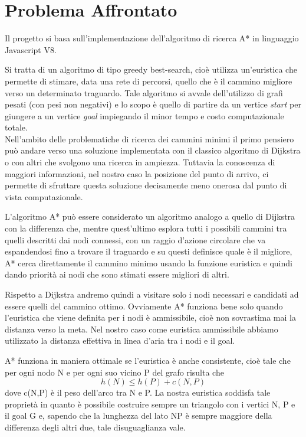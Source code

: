 \documentclass[12pt,a4paper]{report}
\begin{document}
\tableofcontents
\chapter{Problema Affrontato}
Il progetto si basa sull'implementazione dell'algoritmo di ricerca A* in linguaggio Javascript V8.

Si tratta di un algoritmo di tipo greedy best-search, cioè utilizza un'euristica che permette di stimare, data una rete di percorsi, quello che è il cammino migliore verso un determinato traguardo.
Tale algoritmo si avvale dell'utilizzo di grafi pesati (con pesi non negativi) e lo scopo è quello di partire da un vertice \emph{start} per giungere a un vertice \emph{goal} impiegando il minor tempo e costo computazionale totale. 
\\

Nell'ambito delle problematiche di ricerca dei cammini minimi il primo pensiero può andare verso una soluzione implementata con il classico algoritmo di Dijkstra o con altri che svolgono una ricerca in ampiezza. Tuttavia la conoscenza di maggiori informazioni, nel nostro caso la posizione del punto di arrivo, ci permette di sfruttare questa soluzione decisamente meno onerosa dal punto di vista computazionale.

L'algoritmo A* può essere considerato un algoritmo analogo a quello di Dijkstra con la differenza che, mentre quest'ultimo esplora tutti i possibili cammini tra quelli descritti dai nodi connessi, con un raggio d'azione circolare che va espandendosi fino a trovare il traguardo e su questi definisce quale è il migliore, A* cerca direttamente il cammino minimo usando la funzione euristica e quindi dando priorità ai nodi che sono stimati essere migliori di altri.

Rispetto a Dijkstra andremo quindi a visitare solo i nodi necessari e candidati ad essere quelli del cammino ottimo. Ovviamente A* funziona bene solo quando l'euristica che viene definita per i nodi è ammissibile, cioè non sovrastima mai la distanza verso la meta. Nel nostro caso come euristica ammissibile abbiamo utilizzato la distanza effettiva in linea d'aria tra i nodi e il goal.


\newpage
A* funziona in maniera ottimale se l'euristica è anche consistente, cioè tale che per ogni nodo N e per ogni suo vicino P del grafo risulta che \[h(N) \leq h(P) + c(N,P)\]dove c(N,P) è il peso dell'arco tra N e P. La nostra euristica soddisfa tale proprietà in quanto è possibile costruire sempre un triangolo con i vertici N, P e il goal G e, sapendo che la lunghezza del lato NP è sempre maggiore della differenza degli altri due, tale disuguaglianza vale.
\end{document}
